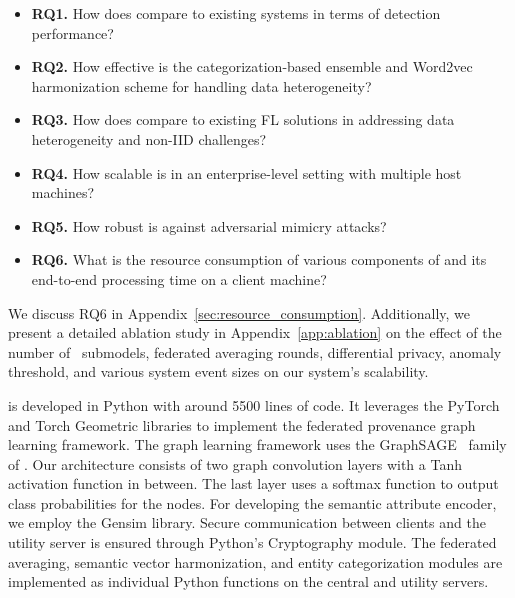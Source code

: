 \begin{itemize}[leftmargin=*,itemsep=0.1em, parsep=0em, topsep=0em]
  \item \textbf{RQ1.} How does \Sys compare to existing systems in terms of detection performance?
  \item \textbf{RQ2.} How effective is the categorization-based \gnnshort ensemble and Word2vec harmonization scheme for handling data heterogeneity?
  \item \textbf{RQ3.} How does \Sys compare to existing FL solutions in addressing data heterogeneity and non-IID challenges?
  \item \textbf{RQ4.} How scalable is \Sys in an enterprise-level setting with multiple host machines?
  \item \textbf{RQ5.} How robust is \Sys against adversarial mimicry attacks?
  \item \textbf{RQ6.} What is the resource consumption of various components of \Sys and its end-to-end processing time on a client machine?
  \end{itemize}  

We discuss RQ6 in Appendix~\ref{sec:resource_consumption}. Additionally, we present a detailed ablation study in Appendix~\ref{app:ablation} on the effect of the number of \gnnshort\ submodels, federated averaging rounds, differential privacy, anomaly threshold, and various system event sizes on our system’s scalability.

 \Sys is developed in Python with around 5500 lines of code. It leverages the PyTorch and Torch Geometric libraries to implement the federated provenance graph learning framework. The graph learning framework uses the GraphSAGE~\cite{hamilton2017inductive} family of \gnnshort. Our architecture consists of two graph convolution layers with a Tanh activation function in between. The last layer uses a softmax function to output class probabilities for the nodes. For developing the semantic attribute encoder, we employ the Gensim library. Secure communication between clients and the utility server is ensured through Python's Cryptography module. The federated averaging, semantic vector harmonization, and entity categorization modules are implemented as individual Python functions on the central and utility servers.

